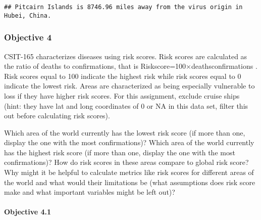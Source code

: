 \documentclass[
]{article}
\begin{document}
\begin{verbatim}
## Pitcairn Islands is 8746.96 miles away from the virus origin in Hubei, China.
\end{verbatim}

\hypertarget{objective-4}{%
\subsubsection{Objective 4}\label{objective-4}}

CSIT-165 characterizes diseases using risk scores. Risk scores are
calculated as the ratio of deaths to confirmations, that is
Riskscore=100×deathsconfirmations . Risk scores equal to 100 indicate
the highest risk while risk scores equal to 0 indicate the lowest risk.
Areas are characterized as being especially vulnerable to loss if they
have higher risk scores. For this assignment, exclude cruise ships
(hint: they have lat and long coordinates of 0 or NA in this data set,
filter this out before calculating risk scores).

Which area of the world currently has the lowest risk score (if more
than one, display the one with the most confirmations)? Which area of
the world currently has the highest risk score (if more than one,
display the one with the most confirmations)? How do risk scores in
these areas compare to global risk score? Why might it be helpful to
calculate metrics like risk scores for different areas of the world and
what would their limitations be (what assumptions does risk score make
and what important variables might be left out)?

\hypertarget{objective-4.1}{%
\paragraph{Objective 4.1}\label{objective-4.1}}
\end{document}
